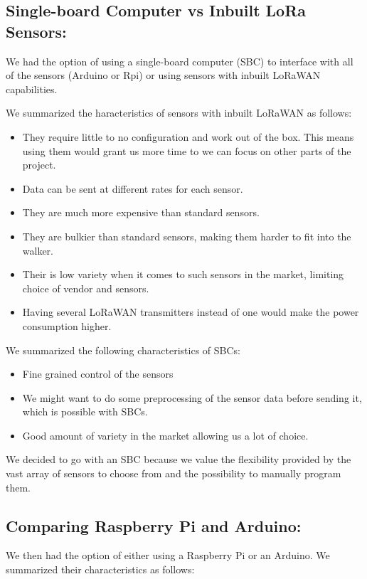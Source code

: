 \subsection{Single-board Computer vs Inbuilt LoRa Sensors:}

We had the option of using a single-board computer (SBC) to interface with all of the sensors (Arduino or Rpi) or using sensors with inbuilt LoRaWAN capabilities.

We summarized the haracteristics of sensors with inbuilt LoRaWAN as follows:
\begin{itemize}
	\item They require little to no configuration and work out of the box. This means using them would grant us more time to we can focus on other parts of the project.
	\item Data can be sent at different rates for each sensor.
	\item They are much more expensive than standard sensors.
	\item They are bulkier than standard sensors, making them harder to fit into the walker.
	\item Their is low variety when it comes to such sensors in the market, limiting choice of vendor and sensors.
	\item Having several LoRaWAN transmitters instead of one would make the power consumption higher.
\end{itemize}


We summarized the following characteristics of SBCs:
\begin{itemize}
	\item Fine grained control of the sensors
	\item We might want to do some preprocessing of the sensor data before sending it, which is possible with SBCs.
	\item Good amount of variety in the market allowing us a lot of choice.
\end{itemize}

We decided to go with an SBC because we value the flexibility provided by the vast array of sensors to choose from and the possibility to manually program them.



\subsection{Comparing Raspberry Pi and Arduino:}

We then had the option of either using a Raspberry Pi or an Arduino. We summarized their characteristics as follows:

